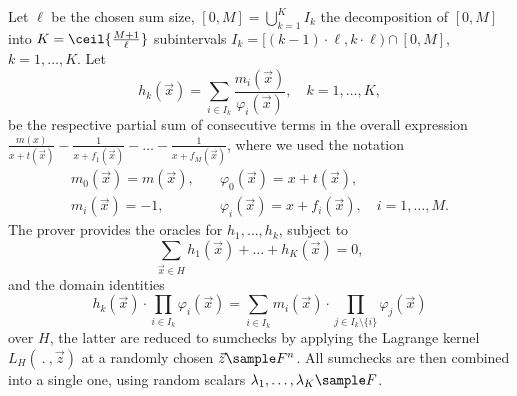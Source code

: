 \documentclass[11pt]{article}
\theoremstyle{definition}
\theoremstyle{definition}
\begin{document}
Let $\ell$ be the chosen sum size, $[0,M] = \bigcup_{k=1}^K I_k$ the decomposition of $[0,M]$ into $K=\ceil{\frac{M+1}{\ell}}$ subintervals $I_k = [(k-1)\cdot \ell, k\cdot\ell)\cap [0,M]$, $k=1,\ldots, K$. 
Let 
\begin{equation}
\label{e:lookup:hk}
h_k(\vec x) = \sum_{i\in I_k} \frac{m_i(\vec x)}{\varphi_i(\vec x)}, \quad k= 1,\ldots, K,
\end{equation}
be the respective partial sum of consecutive terms in the overall expression $\frac{m(x)}{x+t(\vec x)} - \frac{1}{x + f_1(\vec x)} - \ldots - \frac{1}{x + f_M(\vec x)}$, where we used the notation 
\begin{align*}
m_{0}(\vec x) = m(\vec x), \quad &\varphi_{0}(\vec x) = x + t(\vec x),
\\
m_{i}(\vec x) = -1, \quad &\varphi_{i}(\vec x) = x + f_i(\vec x),  \quad  i=1,\ldots, M.
\end{align*}
The prover provides the oracles for $h_1, \ldots, h_k$, subject to 
\[
\sum_{\vec x \in H} h_1(\vec x) + \ldots + h_{K}(\vec x) = 0,
\] 
and the domain identities
\begin{equation}
\label{e:lookup:h:identity}
h_k(\vec x) \cdot \prod_{i\in I_k} \varphi_i(\vec x) = \sum_{i\in I_k} m_i(\vec x) \cdot \prod_{j\in I_k\setminus\{i\}} \varphi_j(\vec x)
\end{equation}
over $H$, the latter are reduced to sumchecks by applying the Lagrange kernel $L_H(\:.\:, \vec z)$ at a randomly chosen $\vec z\sample F^n$.
All sumchecks are then combined into a single one, using random scalars $\lambda_1,\ldots, \lambda_K\sample F$.
\end{document}
